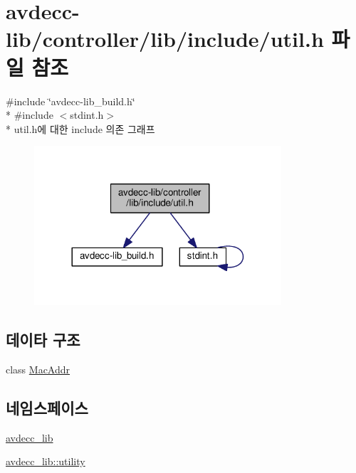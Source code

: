 \hypertarget{avdecc-lib_2controller_2lib_2include_2util_8h}{}\section{avdecc-\/lib/controller/lib/include/util.h 파일 참조}
\label{avdecc-lib_2controller_2lib_2include_2util_8h}
{\ttfamily \#include \char`\"{}avdecc-\/lib\+\_\+build.\+h\char`\"{}}\\*
{\ttfamily \#include $<$stdint.\+h$>$}\\*
util.\+h에 대한 include 의존 그래프
\nopagebreak
\begin{figure}[H]
\begin{center}
\leavevmode
\includegraphics[width=260pt]{avdecc-lib_2controller_2lib_2include_2util_8h__incl}
\end{center}
\end{figure}
\subsection*{데이타 구조}
\begin{DoxyCompactItemize}
\item 
class \hyperlink{classavdecc__lib_1_1utility_1_1_mac_addr}{Mac\+Addr}
\end{DoxyCompactItemize}
\subsection*{네임스페이스}
\begin{DoxyCompactItemize}
\item 
 \hyperlink{namespaceavdecc__lib}{avdecc\+\_\+lib}
\item 
 \hyperlink{namespaceavdecc__lib_1_1utility}{avdecc\+\_\+lib\+::utility}
\end{DoxyCompactItemize}
